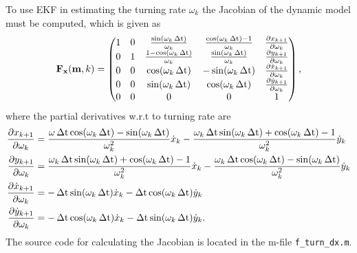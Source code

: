 To use EKF in estimating the turning rate $\omega_k$ the Jacobian of
the dynamic model must be computed, which is given as
%
\begin{equation} \mathbf{F}_{\mathbf{x}}(\mathbf{m},k) = \begin{pmatrix} 1 & 0
& \frac{\sin(\omega_{k} \operatorname{\Delta t})}{\omega_{k}} & \frac{\cos(\omega_{k} \operatorname{\Delta t})
-1}{\omega_{k}} & \frac{\partial x_{k+1}}{\partial \omega_k} \\ 0 & 1
& \frac{1-\cos(\omega_{k} \operatorname{\Delta t})}{\omega_{k}} & \frac{\sin(\omega_{k}
\operatorname{\Delta t})}{\omega_{k}} & \frac{\partial y_{k+1}}{\partial \omega_k} \\ 0 &
0 & \cos(\omega_{k} \operatorname{\Delta t}) & -\sin(\omega_{k} \operatorname{\Delta t}) & \frac{\partial
\dot{x}_{k+1}}{\partial \omega_k} \\ 0 & 0 & \sin(\omega_{k} \operatorname{\Delta t}) &
\cos(\omega_{k} \operatorname{\Delta t}) & \frac{\partial \dot{y}_{k+1}}{\partial
\omega_k} \\ 0 & 0 & 0 & 0 & 1\\
\end{pmatrix},
\end{equation}
%
where the partial derivatives w.r.t to turning rate are
%
\begin{equation}
\begin{split} \frac{\partial x_{k+1}}{\partial \omega_k} & =
\frac{\omega \operatorname{\Delta t} \cos(\omega_k \operatorname{\Delta t}) - \sin(\omega_k \operatorname{\Delta t})}{\omega_k^2}
\dot{x}_k - \frac{\omega_k \operatorname{\Delta t} \sin(\omega_k \operatorname{\Delta t}) + \cos(\omega_k \operatorname{\Delta t})
- 1}{\omega_k^2} \dot{y}_k \\ \frac{\partial y_{k+1}}{\partial
\omega_k} & = \frac{\omega_k \operatorname{\Delta t} \sin(\omega_k \operatorname{\Delta t}) + \cos(\omega_k
\operatorname{\Delta t}) -1}{\omega_k^2} \dot{x}_k - \frac{\omega_k \operatorname{\Delta t} \cos(\omega_k \operatorname{\Delta t})
- \sin(\omega_k \operatorname{\Delta t})}{\omega_k^2} \dot{y}_k \\ \frac{\partial
\dot{x}_{k+1}}{\partial \omega_k} & = -\operatorname{\Delta t} \sin(\omega_k \operatorname{\Delta t})
\dot{x}_k - \operatorname{\Delta t} \cos(\omega_k \operatorname{\Delta t}) \dot{y}_k \\ \frac{\partial
\dot{y}_{k+1}}{\partial \omega_k} & = -\operatorname{\Delta t} \cos(\omega_k \operatorname{\Delta t})
\dot{x}_k - \operatorname{\Delta t} \sin(\omega_k \operatorname{\Delta t}) \dot{y}_k.
\end{split}
\end{equation}
%
The source code for calculating the Jacobian is located in the m-file
\texttt{f\_turn\_dx.m}.

